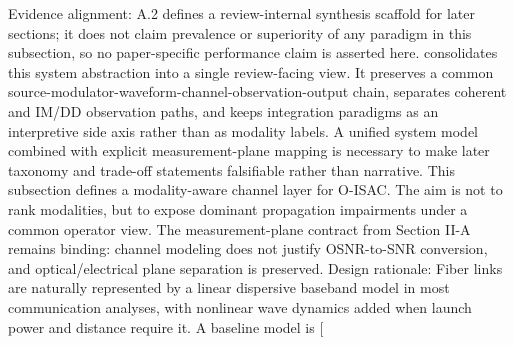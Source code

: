 {}Evidence alignment: A.2 defines a review-internal synthesis scaffold for later sections; it does not claim prevalence or superiority of any paradigm in this subsection, so no paper-specific performance claim is asserted here.\markdownRendererParagraphSeparator
{} consolidates this system abstraction into a single review-facing view. It preserves a common source-modulator-waveform-channel-observation-output chain, separates coherent and IM/DD observation paths, and keeps integration paradigms as an interpretive side axis rather than as modality labels.\markdownRendererParagraphSeparator
{}\markdownRendererParagraphSeparator
{} A unified system model combined with explicit measurement-plane mapping is necessary to make later taxonomy and trade-off statements falsifiable rather than narrative.\markdownRendererInterblockSeparator
{}\markdownRendererThematicBreak{}\markdownRendererInterblockSeparator
{}
\markdownRendererSectionEnd 
\markdownRendererSectionEnd \markdownRendererSectionBegin
{}\markdownRendererInterblockSeparator
{}This subsection defines a modality-aware channel layer for O-ISAC. The aim is not to rank modalities, but to expose dominant propagation impairments under a common operator view. The measurement-plane contract from Section II-A remains binding: channel modeling does not justify OSNR-to-SNR conversion, and optical/electrical plane separation is preserved.\markdownRendererInterblockSeparator
{}\markdownRendererSectionBegin
{}\markdownRendererInterblockSeparator
{}Design rationale: Fiber links are naturally represented by a linear dispersive baseband model in most communication analyses, with nonlinear wave dynamics added when launch power and distance require it.\markdownRendererParagraphSeparator
{}A baseline model is\markdownRendererSoftLineBreak
{}[\markdownRendererSoftLineBreak
